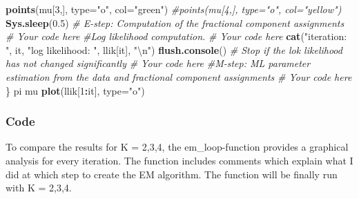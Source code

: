 \documentclass[]{article}
\newenvironment{Shaded}{\begin{snugshade}}{\end{snugshade}}
\newcommand{\KeywordTok}[1]{\textcolor[rgb]{0.13,0.29,0.53}{\textbf{#1}}}
\newcommand{\DataTypeTok}[1]{\textcolor[rgb]{0.13,0.29,0.53}{#1}}
\newcommand{\DecValTok}[1]{\textcolor[rgb]{0.00,0.00,0.81}{#1}}
\newcommand{\FloatTok}[1]{\textcolor[rgb]{0.00,0.00,0.81}{#1}}
\newcommand{\CharTok}[1]{\textcolor[rgb]{0.31,0.60,0.02}{#1}}
\newcommand{\StringTok}[1]{\textcolor[rgb]{0.31,0.60,0.02}{#1}}
\newcommand{\CommentTok}[1]{\textcolor[rgb]{0.56,0.35,0.01}{\textit{#1}}}
\newcommand{\OperatorTok}[1]{\textcolor[rgb]{0.81,0.36,0.00}{\textbf{#1}}}
\newcommand{\NormalTok}[1]{#1}
\begin{document}
\begin{Shaded}
\begin{Highlighting}[]
\KeywordTok{points}\NormalTok{(mu[}\DecValTok{3}\NormalTok{,], }\DataTypeTok{type=}\StringTok{"o"}\NormalTok{, }\DataTypeTok{col=}\StringTok{"green"}\NormalTok{)}
\CommentTok{#points(mu[4,], type="o", col="yellow")}
\KeywordTok{Sys.sleep}\NormalTok{(}\FloatTok{0.5}\NormalTok{)}
\CommentTok{# E-step: Computation of the fractional component assignments}
\CommentTok{# Your code here}
\CommentTok{#Log likelihood computation.}
\CommentTok{# Your code here}
\KeywordTok{cat}\NormalTok{(}\StringTok{"iteration: "}\NormalTok{, it, }\StringTok{"log likelihood: "}\NormalTok{, llik[it], }\StringTok{"}\CharTok{\textbackslash{}n}\StringTok{"}\NormalTok{)}
\KeywordTok{flush.console}\NormalTok{()}
\CommentTok{# Stop if the lok likelihood has not changed significantly}
\CommentTok{# Your code here}
\CommentTok{#M-step: ML parameter estimation from the data and fractional component assignments}
\CommentTok{# Your code here}
\NormalTok{\}}
\NormalTok{pi}
\NormalTok{mu}
\KeywordTok{plot}\NormalTok{(llik[}\DecValTok{1}\OperatorTok{:}\NormalTok{it], }\DataTypeTok{type=}\StringTok{"o"}\NormalTok{)}
\end{Highlighting}
\end{Shaded}

\subsubsection{Code}\label{code}

To compare the results for K = 2,3,4, the em\_loop-function provides a
graphical analysis for every iteration. The function includes comments
which explain what I did at which step to create the EM algorithm. The
function will be finally run with K = 2,3,4.
\end{document}
